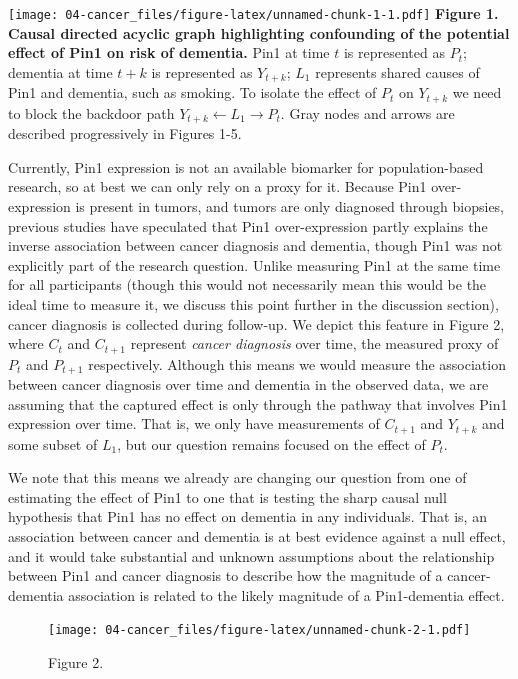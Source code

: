 \documentclass[
]{book}
\begin{document}
\texttt{[image: 04-cancer\_files/figure-latex/unnamed-chunk-1-1.pdf]}
\textbf{Figure 1. Causal directed acyclic graph highlighting confounding of the potential effect of Pin1 on risk of dementia.} Pin1 at time \(t\) is represented as \(P_t\); dementia at time \(t+k\) is represented as \(Y_{t+k}\); \(L_1\) represents shared causes of Pin1 and dementia, such as smoking. To isolate the effect of \(P_t\) on \(Y_{t+k}\) we need to block the backdoor path \(Y_{t+k} \leftarrow L_1 \rightarrow P_t\). Gray nodes and arrows are described progressively in Figures 1-5.

Currently, Pin1 expression is not an available biomarker for population-based research, so at best we can only rely on a proxy for it. Because Pin1 over-expression is present in tumors, and tumors are only diagnosed through biopsies, previous studies have speculated that Pin1 over-expression partly explains the inverse association between cancer diagnosis and dementia, though Pin1 was not explicitly part of the research question\autocite{driver2012,musicco2013,freedman2016,bowles2017,frain2017,schmidt2017,sun2020,ording2020}. Unlike measuring Pin1 at the same time for all participants (though this would not necessarily mean this would be the ideal time to measure it, we discuss this point further in the discussion section), cancer diagnosis is collected during follow-up. We depict this feature in Figure 2, where \(C_t\) and \(C_{t+1}\) represent \emph{cancer diagnosis} over time, the measured proxy of \(P_{t}\) and \(P_{t+1}\) respectively. Although this means we would measure the association between cancer diagnosis over time and dementia in the observed data, we are assuming that the captured effect is only through the pathway that involves Pin1 expression over time. That is, we only have measurements of \(C_{t+1}\) and \(Y_{t+k}\) and some subset of \(L_1\), but our question remains focused on the effect of \(P_t\).

We note that this means we already are changing our question from one of estimating the effect of Pin1 to one that is testing the sharp causal null hypothesis that Pin1 has no effect on dementia in any individuals. That is, an association between cancer and dementia is at best evidence against a null effect, and it would take substantial and unknown assumptions about the relationship between Pin1 and cancer diagnosis to describe how the magnitude of a cancer-dementia association is related to the likely magnitude of a Pin1-dementia effect.

\begin{figure}
\centering
\texttt{[image: 04-cancer\_files/figure-latex/unnamed-chunk-2-1.pdf]}
\caption{\label{fig:unnamed-chunk-2}Figure 2.}
\end{figure}
\end{document}
